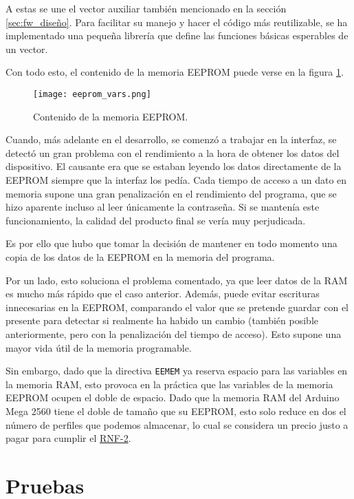A estas se une el vector auxiliar también mencionado en la sección \ref{sec:fw_diseño}. Para facilitar su manejo y hacer el código más reutilizable, se ha implementado una pequeña librería que define las funciones básicas esperables de un vector.

Con todo esto, el contenido de la memoria EEPROM puede verse en la figura \ref{fig:eeprom_vars}.

\begin{figure}[h!]
    \centering
    \texttt{[image: eeprom\_vars.png]}
    \caption{Contenido de la memoria EEPROM.}
    \label{fig:eeprom_vars}
\end{figure}

Cuando, más adelante en el desarrollo, se comenzó a trabajar en la interfaz, se detectó un gran problema con el rendimiento a la hora de obtener los datos del dispositivo. El causante era que se estaban leyendo los datos directamente de la EEPROM siempre que la interfaz los pedía. Cada tiempo de acceso a un dato en memoria supone una gran penalización en el rendimiento del programa, que se hizo aparente incluso al leer únicamente la contraseña. Si se mantenía este funcionamiento, la calidad del producto final se vería muy perjudicada.

Es por ello que hubo que tomar la decisión de mantener en todo momento una copia de los datos de la EEPROM en la memoria del programa.

Por un lado, esto soluciona el problema comentado, ya que leer datos de la RAM es mucho más rápido que el caso anterior. Además, puede evitar escrituras innecesarias en la EEPROM, comparando el valor que se pretende guardar con el presente para detectar si realmente ha habido un cambio (también posible anteriormente, pero con la penalización del tiempo de acceso). Esto supone una mayor vida útil de la memoria programable.

Sin embargo, dado que la directiva \verb|EEMEM| ya reserva espacio para las variables en la memoria RAM, esto provoca en la práctica que las variables de la memoria EEPROM ocupen el doble de espacio. Dado que la memoria RAM del Arduino Mega 2560 tiene el doble de tamaño que su EEPROM, esto solo reduce en dos el número de perfiles que podemos almacenar, lo cual se considera un precio justo a pagar para cumplir el \hyperref[tab:rnf2]{RNF-2}.

\section{Pruebas}

